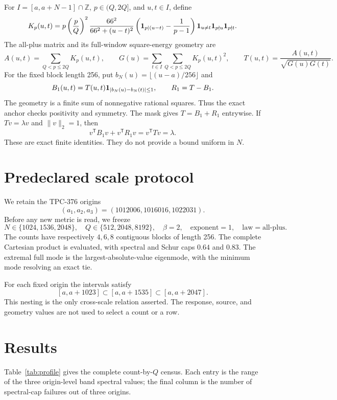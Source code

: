 \documentclass[10pt]{article}
\begin{document}
For $I=[a,a+N-1]\cap\mathbb Z$, $p\in(Q,2Q]$, and $u,t\in I$, define
\[
 K_p(u,t)=p\left(\frac pQ\right)^2
 \frac{66^2}{66^2+(u-t)^2}
 \left({\bf1}_{p\mid(u-t)}-\frac1{p-1}\right)
 {\bf1}_{u\ne t}{\bf1}_{p\nmid u}{\bf1}_{p\nmid t}.
\]
The all-plus matrix and its full-window square-energy geometry are
\[
 A(u,t)=\sum_{Q<p\le 2Q}K_p(u,t),\qquad
 G(u)=\sum_{t\in I}\sum_{Q<p\le2Q}K_p(u,t)^2,
 \qquad T(u,t)=\frac{A(u,t)}{\sqrt{G(u)G(t)}}.
\]
For the fixed block length 256, put
$b_N(u)=\lfloor(u-a)/256\rfloor$ and
\[
 B_1(u,t)=T(u,t){\bf1}_{|b_N(u)-b_N(t)|\le1},
 \qquad R_1=T-B_1.
\]
The geometry is a finite sum of nonnegative rational squares. Thus the
exact anchor checks positivity and symmetry. The mask gives $T=B_1+R_1$
entrywise. If $Tv=\lambda v$ and $\|v\|_2=1$, then
\[
 v^\mathsf{T}B_1v+v^\mathsf{T}R_1v
 =v^\mathsf{T}Tv=\lambda.
\]
These are exact finite identities. They do not provide a bound uniform in
$N$.

\section{Predeclared scale protocol}

We retain the TPC-376 origins
\[
 (a_1,a_2,a_3)=(1012006,1016016,1022031).
\]
Before any new metric is read, we freeze
\[
 N\in\{1024,1536,2048\},\quad
 Q\in\{512,2048,8192\},\quad
 \beta=2,\quad \text{exponent}=1,\quad \text{law}=\text{all-plus}.
\]
The counts have respectively $4,6,8$ contiguous blocks of length 256.
The complete Cartesian product is evaluated, with spectral and Schur caps
$0.64$ and $0.83$. The extremal full mode is the largest-absolute-value
eigenmode, with the minimum mode resolving an exact tie.

For each fixed origin the intervals satisfy
\[
 [a,a+1023]\subset [a,a+1535]\subset [a,a+2047].
\]
This nesting is the only cross-scale relation asserted. The response,
source, and geometry values are not used to select a count or a row.

\section{Results}

Table~\ref{tab:profile} gives the complete count-by-$Q$ census. Each entry
is the range of the three origin-level band spectral values; the final
column is the number of spectral-cap failures out of three origins.
\end{document}
